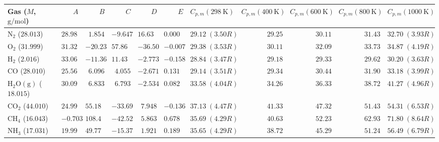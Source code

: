 \begin{center}
\label{tab:04:shomate}
\scriptsize\setlength{\tabcolsep}{3.5pt}\renewcommand{\arraystretch}{1.08}
\begin{tabularx}{\linewidth}{@{}l r r r r r r r r r X@{}}\toprule
\textbf{Gas ($M$, $\si{\gram\per\mole}$)} & \textbf{$A$} & \textbf{$B$} & \textbf{$C$} & \textbf{$D$} & \textbf{$E$} & \textbf{$C_{p,m}(\SI{298}{\kelvin})$} & \textbf{$C_{p,m}(\SI{400}{\kelvin})$} & \textbf{$C_{p,m}(\SI{600}{\kelvin})$} & \textbf{$C_{p,m}(\SI{800}{\kelvin})$} & \textbf{$C_{p,m}(\SI{1000}{\kelvin})$} \\\midrule
$\mathrm{N_2}$ ($28.013$) & $28.986$ & $1.854$ & $-9.647$ & $16.635$ & $0.0001$ & $29.12\;(3.50R)$ & $29.25$ & $30.11$ & $31.43$ & $32.70\;(3.93R)$ \\
$\mathrm{O_2}$ ($31.999$) & $31.322$ & $-20.235$ & $57.866$ & $-36.506$ & $-0.0074$ & $29.38\;(3.53R)$ & $30.11$ & $32.09$ & $33.73$ & $34.87\;(4.19R)$ \\
$\mathrm{H_2}$ ($2.016$) & $33.066$ & $-11.363$ & $11.433$ & $-2.773$ & $-0.1586$ & $28.84\;(3.47R)$ & $29.18$ & $29.33$ & $29.62$ & $30.20\;(3.63R)$ \\
$\mathrm{CO}$ ($28.010$) & $25.568$ & $6.096$ & $4.055$ & $-2.671$ & $0.1310$ & $29.14\;(3.51R)$ & $29.34$ & $30.44$ & $31.90$ & $33.18\;(3.99R)$ \\
$\mathrm{H_2O(g)}$ ($18.015$) & $30.092$ & $6.833$ & $6.793$ & $-2.534$ & $0.0821$ & $33.58\;(4.04R)$ & $34.26$ & $36.33$ & $38.72$ & $41.27\;(4.96R)$ \\
$\mathrm{CO_2}$ ($44.010$) & $24.997$ & $55.187$ & $-33.691$ & $7.948$ & $-0.1366$ & $37.13\;(4.47R)$ & $41.33$ & $47.32$ & $51.43$ & $54.31\;(6.53R)$ \\
$\mathrm{CH_4}$ ($16.043$) & $-0.703$ & $108.477$ & $-42.522$ & $5.863$ & $0.6786$ & $35.69\;(4.29R)$ & $40.63$ & $52.23$ & $62.93$ & $71.80\;(8.64R)$ \\
$\mathrm{NH_3}$ ($17.031$) & $19.996$ & $49.771$ & $-15.376$ & $1.921$ & $0.1892$ & $35.65\;(4.29R)$ & $38.72$ & $45.29$ & $51.24$ & $56.49\;(6.79R)$ \\\bottomrule
\end{tabularx}
\end{center}

